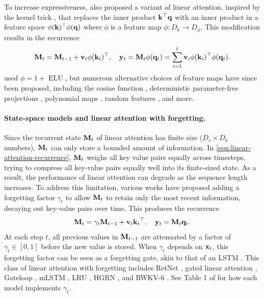 \documentclass[notitlepage, 11pt]{article}
\newcommand*{\dkey}{{D_k}}
\newcommand*{\dphi}{{D_\phi}}
\newcommand*{\dval}{{D_v}}
\begin{document}
To increase expressiveness, \citet{Katharopoulos2020TransformersAreRNNs} also proposed a variant of linear attention, inspired by the kernel trick \citep{Scholkopf2001LearningKernelsSupport}, that replaces the inner product $\mathbf{k}{}^\top\mathbf{q}$ with an inner product in a feature space $\phi(\mathbf{k}){}^\top\phi(\mathbf{q})$ where $\phi$ is a feature map $\phi:\dkey\to\dphi$.
This modification results in the recurrence
\begin{align}
    \mathbf{M}_t = \mathbf{M}_{t-1} + \mathbf{v}_t\phi(\mathbf{k}_t){}^\top, \quad \mathbf{y}_t = \mathbf{M}_t \phi(\mathbf{q}_t) = \sum_{i=1}^t \mathbf{v}_i\phi(\mathbf{k}_i){}^\top\phi(\mathbf{q}_t).
\end{align}
\citet{Katharopoulos2020TransformersAreRNNs} used $\phi = 1 + \operatorname{ELU}$, but numerous alternative choices of feature maps have since been proposed, including the cosine function \citep{Qin2021CosFormerRethinkingSoftmax}, deterministic parameter-free projections \citep{Schlag2021LinearTransformersAre}, polynomial maps \citep{Zhang2023HedgehogPorcupineExpressive,Aksenov2024LinearTransformersLearnable,Arora2024SimpleLinearAttention}, random features \citep{Peng2020RandomFeatureAttention,Choromanski2020RethinkingAttentionPerformers,Chen2024DiJiangEfficientLarge}, and more.

\paragraph{State-space models and linear attention with forgetting.}
Since the recurrent state $\mathbf{M}_t$ of linear attention has finite size ($\dval\times\dkey$ numbers), $\mathbf{M}_t$ can only store a bounded amount of information.
In \autoref{eqn:linear-attention-recurrence}, $\mathbf{M}_t$ weighs all key value pairs equally across timesteps, trying to compress all key-value pairs equally well into its finite-sized state.
As a result, the performance of linear attention can degrade as the sequence length increases.
To address this limitation, various works have proposed adding a forgetting factor $\gamma_t$ to allow $\mathbf{M}_t$ to retain only the most recent information, decaying out key-value pairs over time.
This produces the recurrence
\begin{align}
    \mathbf{M}_t = \gamma_t \mathbf{M}_{t-1} + \mathbf{v}_t\mathbf{k}_t{}^\top, \quad \mathbf{y}_t = \mathbf{M}_t \mathbf{q}_t. \label{eqn:gated-linear-attention-recurrence}
\end{align}
At each step $t$, all previous values in $\mathbf{M}_{t-1}$ are attenuated by a factor of $\gamma_t\in[0, 1]$ before the new value is stored.
When $\gamma_t$ depends on $\mathbf{x}_t$, this forgetting factor can be seen as a forgetting gate, akin to that of an LSTM \citep{Hochreiter1997LongShortTermMemory}.
This class of linear attention with forgetting includes RetNet \citep{Sun2023RetentiveNetworkSuccessor}, gated linear attention \citep{Yang2024GatedLinearAttention}, Gateloop \citep{Katsch2024GateLoopFullyDataControlled}, mLSTM \citep{Beck2024XLSTMExtendedLong}, LRU \citep{Orvieto2023ResurrectingRecurrentNeural}, HGRN \citep{Qin2024HGRN2GatedLinear}, and RWKV-6 \citep{Peng2024EagleFinchRWKV}.
See Table 1 of \citet{Yang2024GatedLinearAttention} for how each model implements $\gamma_t$.
\end{document}
